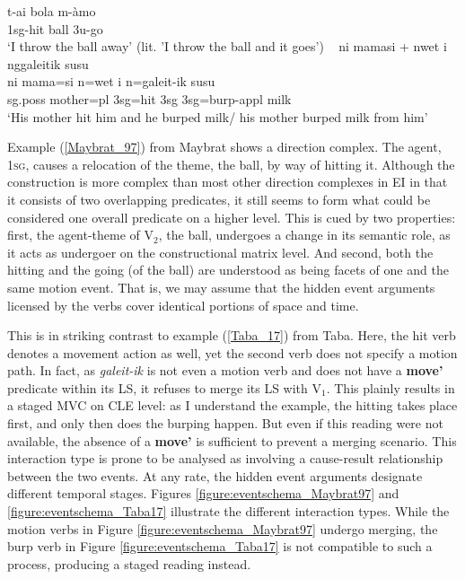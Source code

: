 \ea \label{Maybrat_97} 
\gll t-ai bola m-àmo \\
1\acs{sg}-hit ball 3\acs{u}-go \\
\glft `I throw the ball away' (lit. 'I throw the ball and it goes') \ 
\z
\xe
\ea \label{Taba_17}
\gll ni mamasi + nwet i nggaleitik susu \\
ni mama=si n=wet i n=galeit-ik susu \\
\acs{sg}.\acs{poss} mother=\acs{pl} 3\acs{sg}=hit 3\acs{sg} 3\acs{sg}=burp-\acs{appl} milk\\
\glft `His mother hit him and he burped milk/ his mother burped milk from him' \ 
\z
\xe

Example (\ref{Maybrat_97}) from Maybrat shows a direction complex. The agent, 1\textsc{sg}, causes a relocation of the theme, the ball, by way of hitting it. Although the construction is more complex than most other direction complexes in EI in that it consists of two overlapping predicates, it still seems to form what could be considered one overall predicate on a higher level. This is cued by two properties: first, the agent-theme of V$_2$, the ball, undergoes a change in its semantic role, as it acts as undergoer on the constructional matrix level. And second, both the hitting and the going (of the ball) are understood as being facets of one and the same motion event. That is, we may assume that the hidden event arguments licensed by the verbs cover identical portions of space and time. 

This is in striking contrast to example (\ref{Taba_17}) from Taba. Here, the hit verb denotes a movement action as well, yet the second verb does not specify a motion path. In fact, as \textit{galeit-ik} is not even a motion verb and does not have a \textbf{move'} predicate within its LS, it refuses to merge its LS with V$_1$. This plainly results in a staged MVC on CLE level: as I understand the example, the hitting takes place first, and only then does the burping happen. But even if this reading were not available, the absence of a \textbf{move'} is sufficient to prevent a merging scenario. This interaction type is prone to be analysed as involving a cause-result relationship between the two events. At any rate, the hidden event arguments designate different temporal stages. Figures \ref{figure:eventschema_Maybrat97} and \ref{figure:eventschema_Taba17} illustrate the different interaction types. While the motion verbs in Figure \ref{figure:eventschema_Maybrat97} undergo merging, the burp verb in Figure \ref{figure:eventschema_Taba17} is not compatible to such a process, producing a staged reading instead.

